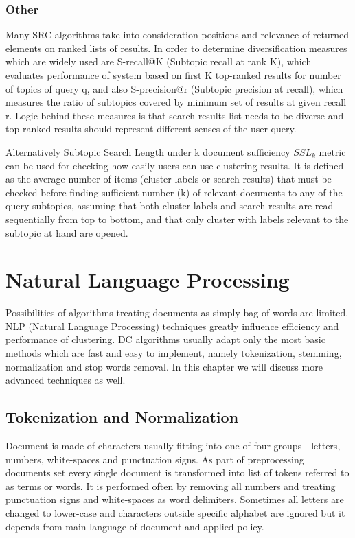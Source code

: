 \documentclass[a4paper, 12pt, oneside]{Thesis} %
\begin{document}
\subsection{Other} Many SRC algorithms take into consideration positions and relevance of returned elements on ranked lists of results. In order to determine diversification measures which are widely used are S-recall@K (Subtopic recall at rank K), which evaluates performance of system based on first K top-ranked results for number of topics of query q, and also S-precision@r (Subtopic precision at recall), which measures the ratio of subtopics covered by minimum set of results at given recall r. Logic behind these measures is that search results list needs to be diverse and top ranked results should represent different senses of the user query.

Alternatively Subtopic Search Length under k document sufficiency $ SSL_k $ metric can be used for checking how easily users can use clustering results. It is defined as the average number of items (cluster labels or search results) that must be checked before finding sufficient number (k) of relevant documents to any of the query subtopics, assuming that both cluster labels and search results are read sequentially from top to bottom, and that only cluster with labels relevant to the subtopic at hand are opened.

\chapter{Natural Language Processing} Possibilities of algorithms treating documents as simply bag-of-words are limited. NLP (Natural Language Processing) techniques greatly influence efficiency and performance of clustering. DC algorithms usually adapt only the most basic methods which are fast and easy to implement, namely tokenization, stemming, normalization and stop words removal. In this chapter we will discuss more advanced techniques as well.

\section{Tokenization and Normalization} Document is made of characters usually fitting into one of four groups - letters, numbers, white-spaces and punctuation signs. As part of preprocessing documents set every single document is transformed into list of tokens referred to as terms or words. It is performed often by removing all numbers and treating punctuation signs and white-spaces as word delimiters. Sometimes all letters are changed to lower-case and characters outside specific alphabet are ignored but it depends from main language of document and applied policy.
\end{document}
